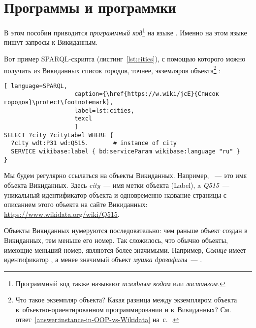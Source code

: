 

\chapter{Программы и программки}
\label{ch:listing_about}

В этом пособии приводится \emph{программный код}\footnote[][0cm]{%
    Программный код также называют  \emph{исходным кодом} или 
    \emph{листингом}.
%   
} на языке . 
Именно на этом языке пишут запросы к Викиданным.


Вот пример SPARQL-скрипта (листинг~\ref{lst:cities}), 
с помощью которого можно получить из Викиданных список городов, 
точнее, экземляров объекта\footnote{\label{question:instance-in-OOP-vs-Wikidata}Что такое экземпляр объекта? 
    Какая разница между экземпляром объекта 
    в~объектно-ориентированном программировании и в~Викиданных?
    См. ответ~\ref{answer:instance-in-OOP-vs-Wikidata} на~с.~\pageref{answer:instance-in-OOP-vs-Wikidata}.
    }
:

\begin{lstlisting}[ language=SPARQL, 
                    caption={\href{https://w.wiki/jcE}{Список городов}\protect\footnotemark},
                    label=lst:cities,
                    texcl 
                    ]
SELECT ?city ?cityLabel WHERE { 
  ?city wdt:P31 wd:Q515.       # instance of city
  SERVICE wikibase:label { bd:serviceParam wikibase:language "ru" }
}
\end{lstlisting}%

Мы будем регулярно ссылаться на объекты Викиданных. 
Например, ~--- это имя объекта Викиданных. 
Здесь \emph{city}~--- имя метки объекта (Label), 
a \emph{Q515}~--- уникальный идентификатор объекта 
и одновременно название страницы с описанием этого объекта на сайте Викиданных: \href{https://www.wikidata.org/wiki/Q515}{https://www.wikidata.org/wiki/Q515}.

\label{WDObjectsNumbering}
Объекты Викиданных нумеруются последовательно: чем раньше 
объект создан в Викиданных, тем меньше его номер. 
Так сложилось, что обычно объекты, имеющие меньший номер, являются более значимыми. 
Например, \emph{Солнце} имеет идентификатор , а менее значимый объект \emph{мушка дрозофилы}~--- .
